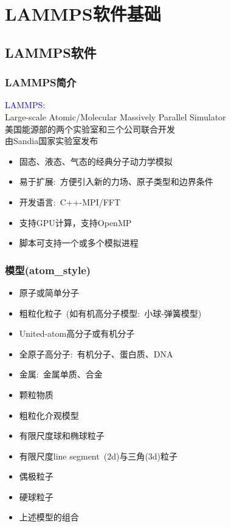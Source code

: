 \section{{\rm LAMMPS}软件基础}
\subsection{{\rm LAMMPS}软件}
\frame
{
	\frametitle{\textrm{LAMMPS}简介}
	\textcolor{blue}{\textrm{LAMMPS}}:\\
	\textrm{Large-scale Atomic/Molecular Massively Parallel Simulator}\\
	美国能源部的两个实验室和三个公司联合开发\\
	由\textrm{Sandia}国家实验室发布
	\begin{itemize}
			\setlength{\itemsep}{10pt}
		\item 固态、液态、气态的经典分子动力学模拟
		\item 易于扩展:~方便引入新的力场、原子类型和边界条件
		\item 开发语言:~\textrm{C++-MPI/FFT}
		\item 支持\textrm{GPU}计算，支持\textrm{OpenMP}
		\item 脚本可支持一个或多个模拟进程
	\end{itemize}
}

\frame
{
	\frametitle{模型\textrm{(atom\_style)}}
	\begin{itemize}
		\item 原子或简单分子
		\item 粗粒化粒子~(如有机高分子模型:~小球-弹簧模型)
		\item \textrm{United-atom}高分子或有机分子
		\item 全原子高分子:~有机分子、蛋白质、\textrm{DNA}
		\item 金属:~金属单质、合金
		\item 颗粒物质
		\item 粗粒化介观模型
		\item 有限尺度球和椭球粒子
		\item 有限尺度\textrm{line segment~(2d)}与三角\textrm{(3d)}粒子
		\item 偶极粒子
		\item 硬球粒子
		\item 上述模型的组合
	\end{itemize}
}

